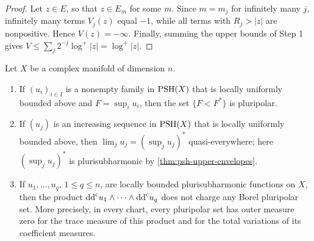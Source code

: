 \begin{proof}
Let $z\in E$, so that $z\in E_m$ for some $m$. Since $m=m_j$ for infinitely many $j$, infinitely many terms $V_j(z)$ equal $-1$, while all terms with $R_j>|z|$ are nonpositive. Hence $V(z)=-\infty$. Finally, summing the upper bounds of Step 1 gives $V\le\sum_j2^{-j}\log^+|z|=\log^+|z|$.
\end{proof}

\begin{corollary}\label{cor:psh-pluripolar-discrepancy}
Let $X$ be a complex manifold of dimension $n$.
\begin{enumerate}
\item If $(u_i)_{i\in I}$ is a nonempty family in $\mathrm{PSH}(X)$ that is locally uniformly bounded above and $F=\sup_iu_i$, then the set $\{F<F^*\}$ is pluripolar.
\item If $(u_j)$ is an increasing sequence in $\mathrm{PSH}(X)$ that is locally uniformly bounded above, then $\lim_ju_j=(\sup_ju_j)^*$ quasi-everywhere; here $(\sup_ju_j)^*$ is plurisubharmonic by \cref{thm:psh-upper-envelopes}.
\item If $u_1,\ldots,u_q$, $1\le q\le n$, are locally bounded plurisubharmonic functions on $X$, then the product $\mathrm{dd}^{\mathrm{c}} u_1\wedge\cdots\wedge\mathrm{dd}^{\mathrm{c}} u_q$ does not charge any Borel pluripolar set. More precisely, in every chart, every pluripolar set has outer measure zero for the trace measure of this product and for the total variations of its coefficient measures.
\end{enumerate}
\end{corollary}
